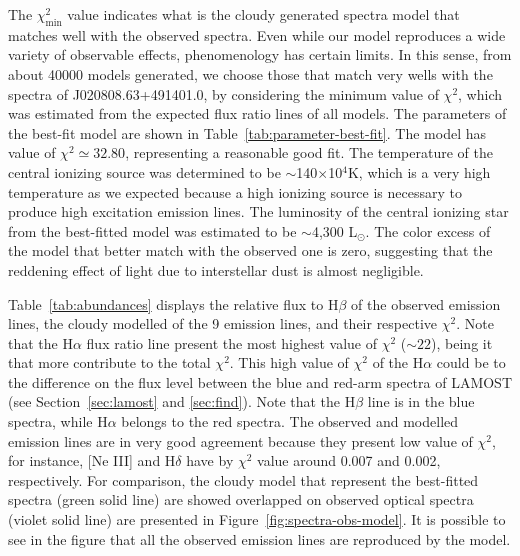 \documentclass[fleqn,usenatbib]{mnras}
\begin{document}
The $\chi^{2}_{\text{min}}$ value indicates what is the {\sc cloudy} generated
spectra model that matches well with the observed spectra. Even while our model reproduces
a wide variety of observable effects, phenomenology has certain limits.
In this sense, from about 40000 models generated, we choose those that
match very wells with the spectra of J020808.63+491401.0,
by considering the minimum  value of $\chi^{2}$, which was estimated from the
expected flux ratio lines of all models.
The parameters of the best-fit model
are shown in Table~\ref{tab:parameter-best-fit}. The
model has value of $\chi^{2} \simeq 32.80$, representing a reasonable good fit.
The temperature of the central ionizing source was determined to be  $\sim$140$\times$10$^{4}$K,
which is a very high temperature as we expected because a high ionizing source is necessary
to produce high excitation emission lines. The luminosity of the central ionizing star from
the best-fitted model was estimated to be $\sim$4,300 L$_{\odot}$. The color excess of the model
that better match with the observed one is zero, suggesting that the reddening effect of light
due to interstellar dust is almost negligible.

Table~\ref{tab:abundances} displays the relative flux to H{$\beta$} of the observed emission lines,
the {\sc cloudy} modelled of the 9 emission lines, and their respective $\chi^{2}$.
Note that the H{$\alpha$} flux ratio line present the most highest value of $\chi^{2}$ ($\sim22$),
being it that more contribute to the total $\chi^{2}$. This high value of $\chi^{2}$ of the H{$\alpha$} could
be to the difference on the flux level between the blue and red-arm spectra of LAMOST (see Section~\ref{sec:lamost}
and \ref{sec:find}). Note that the H{$\beta$} line is in the blue spectra, while H{$\alpha$} belongs to the red spectra.
The observed and modelled emission lines are in very
good agreement because they present low value of $\chi^{2}$, for instance, [Ne III] and H{$\delta$} have by $\chi^{2}$ value
around 0.007 and 0.002, respectively.    
For comparison, the {\sc cloudy} model that represent the best-fitted spectra (green solid line) are
showed overlapped on observed optical spectra (violet solid line) are presented in Figure~\ref{fig:spectra-obs-model}.
It is possible to see in the figure that all the observed emission lines are reproduced by the model. 
\end{document}
